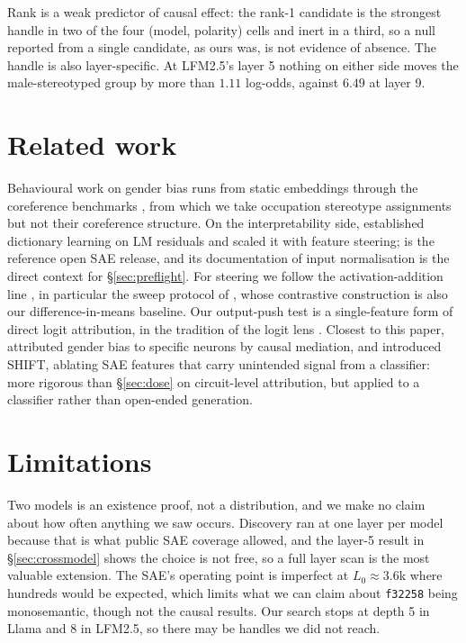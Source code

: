 \documentclass{article}
\newcommand{\ff}[1]{\texttt{f#1}}
\begin{document}
Rank is a weak predictor of causal effect: the rank-1 candidate is the strongest handle in
two of the four (model, polarity) cells and inert in a third, so a null reported from a
single candidate, as ours was, is not evidence of absence. The handle is also layer-specific. At LFM2.5's layer 5 nothing on either side
moves the male-stereotyped group by more than $1.11$ log-odds, against $6.49$ at layer 9.

\section{Related work}
\label{sec:related}

Behavioural work on gender bias runs from static embeddings
\citep{bolukbasi2016,caliskan2017} through the coreference benchmarks
\citep{rudinger2018,zhao2018}, from which we take occupation stereotype assignments but not
their coreference structure. On the interpretability side, \citet{bricken2023} established
dictionary learning on LM residuals and \citet{templeton2024} scaled it with feature
steering; \citet{lieberum2024} is the reference open SAE release, and its documentation of
input normalisation is the direct context for \S\ref{sec:preflight}. For steering we follow
the activation-addition line \citep{turner2023,rimsky2024,li2023}, in particular the sweep
protocol of \citet{rimsky2024}, whose contrastive construction is also our
difference-in-means baseline. Our output-push test is a single-feature form of direct logit
attribution, in the tradition of the logit lens \citep{nostalgebraist2020,belrose2023}.
Closest to this paper, \citet{vig2020} attributed gender bias to specific neurons by causal
mediation, and \citet{marks2024} introduced SHIFT, ablating SAE features that carry
unintended signal from a classifier: more rigorous than \S\ref{sec:dose} on circuit-level
attribution, but applied to a classifier rather than open-ended generation.

\section{Limitations}
\label{sec:limitations}

Two models is an existence proof, not a distribution, and we make no claim about how often
anything we saw occurs. Discovery ran at one layer per model because that is what public
SAE coverage allowed, and the layer-5 result in \S\ref{sec:crossmodel} shows the choice is
not free, so a full layer scan is the most valuable extension. The SAE's operating point is
imperfect at $L_0\approx3.6$k where hundreds would be expected, which limits what we can
claim about \ff{32258} being monosemantic, though not the causal results. Our search stops
at depth 5 in Llama and 8 in LFM2.5, so there may be handles we did not reach.
\end{document}
